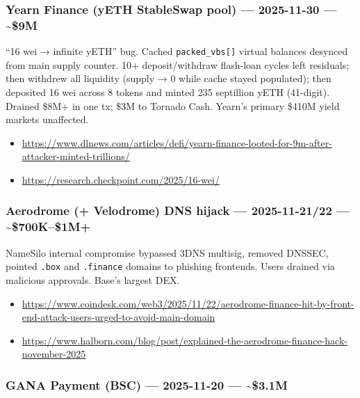 \subsubsection{Yearn Finance (yETH StableSwap pool) --- 2025-11-30 --- \textasciitilde\$9M}\label{yearn-finance-yeth-stableswap-pool-2025-11-30-9m}

``16 wei → infinite yETH'' bug. Cached \texttt{packed\_vbs{[}{]}} virtual balances desynced from main supply counter. 10+ deposit/withdraw flash-loan cycles left residuals; then withdrew all liquidity (supply → 0 while cache stayed populated); then deposited 16 wei across 8 tokens and minted 235 septillion yETH (41-digit). Drained \$8M+ in one tx; \$3M to Tornado Cash. Yearn's primary \$410M yield markets unaffected.

\begin{itemize}
\tightlist
\item
  \url{https://www.dlnews.com/articles/defi/yearn-finance-looted-for-9m-after-attacker-minted-trillions/}
\item
  \url{https://research.checkpoint.com/2025/16-wei/}
\end{itemize}

\subsubsection{Aerodrome (+ Velodrome) DNS hijack --- 2025-11-21/22 --- \textasciitilde\$700K--\$1M+}\label{aerodrome-velodrome-dns-hijack-2025-11-2122-700k1m}

NameSilo internal compromise bypassed 3DNS multisig, removed DNSSEC, pointed \texttt{.box} and \texttt{.finance} domains to phishing frontends. Users drained via malicious approvals. Base's largest DEX.

\begin{itemize}
\tightlist
\item
  \url{https://www.coindesk.com/web3/2025/11/22/aerodrome-finance-hit-by-front-end-attack-users-urged-to-avoid-main-domain}
\item
  \url{https://www.halborn.com/blog/post/explained-the-aerodrome-finance-hack-november-2025}
\end{itemize}

\subsubsection{GANA Payment (BSC) --- 2025-11-20 --- \textasciitilde\$3.1M}\label{gana-payment-bsc-2025-11-20-3.1m}


